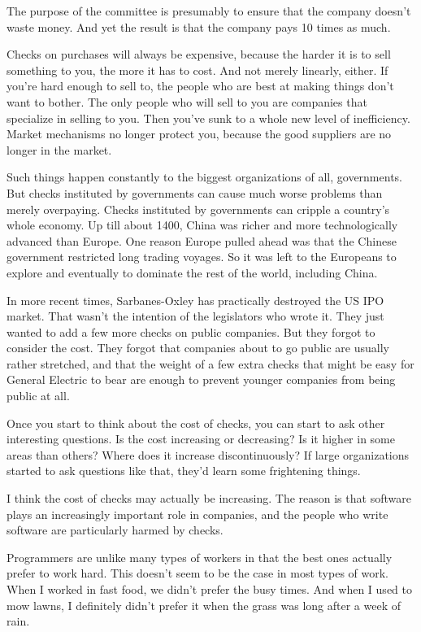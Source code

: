 The purpose of the committee is presumably to ensure that the company
doesn't waste money. And yet the result is that the company pays 10
times as much.

Checks on purchases will always be expensive, because the harder it is
to sell something to you, the more it has to cost. And not merely
linearly, either. If you're hard enough to sell to, the people who are
best at making things don't want to bother. The only people who will
sell to you are companies that specialize in selling to you. Then you've
sunk to a whole new level of inefficiency. Market mechanisms no longer
protect you, because the good suppliers are no longer in the market.

Such things happen constantly to the biggest organizations of all,
governments. But checks instituted by governments can cause much worse
problems than merely overpaying. Checks instituted by governments can
cripple a country's whole economy. Up till about 1400, China was richer
and more technologically advanced than Europe. One reason Europe pulled
ahead was that the Chinese government restricted long trading voyages.
So it was left to the Europeans to explore and eventually to dominate
the rest of the world, including China.

In more recent times, Sarbanes-Oxley has practically destroyed the US
IPO market. That wasn't the intention of the legislators who wrote it.
They just wanted to add a few more checks on public companies. But they
forgot to consider the cost. They forgot that companies about to go
public are usually rather stretched, and that the weight of a few extra
checks that might be easy for General Electric to bear are enough to
prevent younger companies from being public at all.

Once you start to think about the cost of checks, you can start to ask
other interesting questions. Is the cost increasing or decreasing? Is it
higher in some areas than others? Where does it increase
discontinuously? If large organizations started to ask questions like
that, they'd learn some frightening things.

I think the cost of checks may actually be increasing. The reason is
that software plays an increasingly important role in companies, and the
people who write software are particularly harmed by checks.

Programmers are unlike many types of workers in that the best ones
actually prefer to work hard. This doesn't seem to be the case in most
types of work. When I worked in fast food, we didn't prefer the busy
times. And when I used to mow lawns, I definitely didn't prefer it when
the grass was long after a week of rain.

